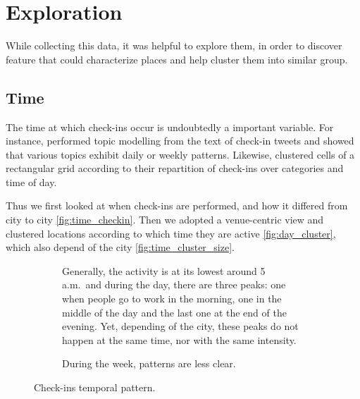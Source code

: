 \section{Exploration}

While collecting this data, it was helpful to explore them, in order to
discover feature that could characterize places and help cluster them into
similar group.

\subsection{Time}

The time at which check-ins occur is undoubtedly a important variable. For
instance, \textcite{UrbanStory12} performed topic modelling from the text of
check-in tweets and showed that various topics exhibit daily or weekly
patterns. Likewise, \textcite{TimeCluster13} clustered cells of a rectangular
grid according to their repartition of check-ins over categories and time of
day.

Thus we first looked at when check-ins are performed, and how it differed from
city to city \autoref{fig:time_checkin}. Then we adopted a venue-centric view
and clustered locations according to which time they are active
\autoref{fig:day_cluster}, which also depend of the city
\autoref{fig:time_cluster_size}.

\begin{figure}[hbt]
    \begin{subfigure}[b]{\textwidth}
    \centering
    \iftoggle{EXTERNALPGF}{%
        \texttt{[image: daily\_checkin]}
    }{%
        
    }
    \caption[Pattern of check-in during the day]{Generally, the activity is at
    its lowest around 5 a.m.\ and during the day, there are three peaks: one
when people go to work in the morning, one in the middle of the day and the
last one at the end of the evening. Yet, depending of the city, these peaks do
not happen at the same time, nor with the same intensity.
\label{fig:daily_checkin}}
    \end{subfigure}

    \begin{subfigure}[b]{\textwidth}
    \centering
    \iftoggle{EXTERNALPGF}{%
        \texttt{[image: weekly\_checkin]}
    }{%
        
    }
    \caption[Pattern of check-in during the week]{During the week, patterns
        are less clear.  \label{fig:weekly_checkin}}
    \end{subfigure}
    \caption{Check-ins temporal pattern.\label{fig:time_checkin}}
\end{figure}

